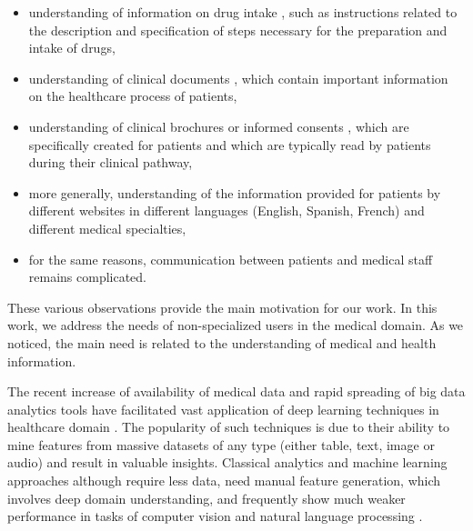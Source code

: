 \begin{itemize}
    \item  understanding of information on drug intake \citep{VanderStichele-WILEY1999, Patel-IJMI2002}, such as instructions related to the description and specification of steps necessary for the preparation and intake of drugs,
    
    \item  understanding of clinical documents \citep{Zeng-MEDINFO2007}, which contain important information on the healthcare process of patients,
    
    \item  understanding of clinical brochures or informed consents \citep{Williams-JAMA1995}, which are specifically created for patients and which are typically read by patients during their clinical pathway,
    
    \item  more generally, understanding of the information provided for patients by different websites \citep{Oregon-2008, Brigo-EB2015} in different languages (English, Spanish, French) and different medical specialties,
    
    \item for the same reasons, communication between patients and medical staff \citep{Jucks-HC2007, Tran-EC2009} remains complicated.
\end{itemize}
These various observations provide the main motivation for our work. In this work, we address the needs of non-specialized users in the medical domain. As we noticed, the main need is related to the understanding of medical and health information. 

The recent increase of availability of medical data and rapid spreading of big data analytics tools have facilitated vast application of deep learning techniques in healthcare domain \citep{Jiang-BMJ2017}. The popularity of such techniques is due to their ability to mine features from massive datasets of any type (either table, text, image or audio) and result in valuable insights. Classical analytics and machine learning approaches although require less data, need manual feature generation, which involves deep domain understanding, and frequently show much weaker performance in tasks of computer vision and natural language processing \citep{Krizhevsky-NIPS2012, Zhang-NIPS2015}.   

